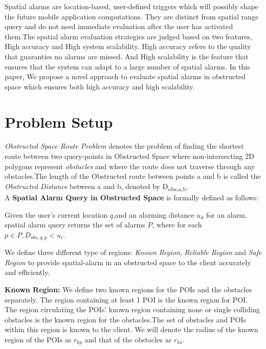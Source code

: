 \documentclass{sig-alternate}
\begin{document}
Spatial alarms are location-based, user-defined triggers which will possibly shape the future mobile application computations. They are distinct from spatial range query and do not need immediate evaluation after the user has activated them.The spatial alarm evaluation strategies are judged based on two features, High accuracy and High system scalability. High accuracy refers to the quality that guaranties no alarms are missed. And High scalability is the feature that ensures that the system can adapt to a large number of spatial alarms.
In this paper, We propose a novel approach to evaluate spatial alarms in obstructed space which ensures both high accuracy and high scalability.


\section{Problem Setup}
\textit{Obstructed Space Route Problem} denotes the problem of finding the shortest route between two query-points  in Obstructed Space where non-intersecting 2D polygons represent \textit{obstacles} and where the route does not traverse through any obstacles.The length of the Obstructed route between points a and b is called the \textit{Obstructed Distance} between a and b, denoted by D\textsubscript{obs,a,b}.\\
A \textbf{Spatial Alarm Query in Obstructed Space} is formally defined as follows:
\begin{defn}
Given the user's current location $q$,and an alarming distance $u_d$ for an alarm, spatial alarm query returns the set of alarms $P$, where for each $p \in P, D_{obs,q,p} < u_i$. 
\end{defn}
We define three different type of regions: \textit{Known Region}, \textit{Reliable Region} and \textit{Safe Region} to provide spatial-alarm in an obstructed space to the client accurately and efficiently.

\begin{defn} 
\textbf{Known Region:} We define two known regions for the POIs and the obstacles separately. The region containing at least 1 POI is the known region for POI.\\
The region circulating the POIs' known region containing none or single colliding obstacles is the known region for the obstacles.The set of obstacles and POIs within this region is known to the client. 
We will denote the radius of the known region of the POIs as $r_{kp}$ and that of the obstacles as $r_{ko}$.
\end{defn}
\end{document}
